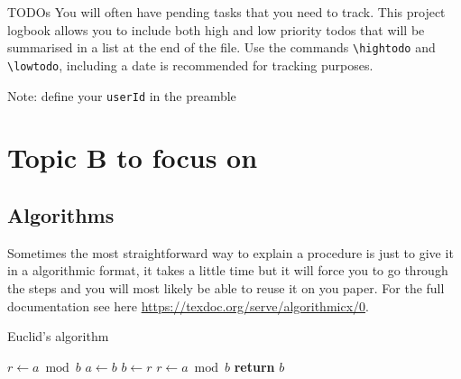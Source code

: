 \documentclass{project-logbook}
\begin{document}
		\begin{HighlightedNote}{TODOs}
			You will often have pending tasks that you need to track. This project logbook allows you to include both high and low priority todos that will be summarised in a list at the end of the file. Use the commands \texttt{\textbackslash hightodo} and \texttt{\textbackslash lowtodo}, including a date is recommended for tracking purposes.

			Note: define your \texttt{userId} in the preamble
		\end{HighlightedNote}





\section{Topic B to focus on} \label{sec:topic_B}

	\subsection{Algorithms} \label{sub:algorithms}

		\begin{HighlightedNote}{}
			Sometimes the most straightforward way to explain a procedure is just to give it in a algorithmic format, it takes a little time but it will force you to go through the steps and you will most likely be able to reuse it on you paper. For the full documentation see here \url{https://texdoc.org/serve/algorithmicx/0}.
		\end{HighlightedNote}

		\begin{algorithm}
			\caption{Euclid’s algorithm}\label{alg:euclid}
			\begin{algorithmic}[1]
					\State $r\gets a\bmod b$
						\State $a\gets b$
						\State $b\gets r$
						\State $r\gets a\bmod b$
					\EndWhile\label{euclidendwhile}
					\State \textbf{return} $b$
				\EndProcedure
			\end{algorithmic}
		\end{algorithm}
\end{document}
